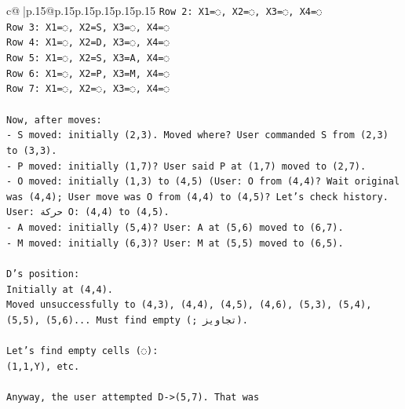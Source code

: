 \documentclass{article}
\begin{document}
{\begin{supertabular}{c@{$\;$}|p{.15\linewidth}@{}p{.15\linewidth}p{.15\linewidth}p{.15\linewidth}p{.15\linewidth}p{.15\linewidth}}
{{{\texttt{Row 2: X1=◌, X2=◌, X3=◌, X4=◌} \\
\texttt{Row 3: X1=◌, X2=S, X3=◌, X4=◌} \\
\texttt{Row 4: X1=◌, X2=D, X3=◌, X4=◌} \\
\texttt{Row 5: X1=◌, X2=S, X3=A, X4=◌} \\
\texttt{Row 6: X1=◌, X2=P, X3=M, X4=◌} \\
\texttt{Row 7: X1=◌, X2=◌, X3=◌, X4=◌} \\
\\ 
\texttt{Now, after moves:} \\
\texttt{{-} S moved: initially (2,3). Moved where? User commanded S from (2,3) to (3,3).} \\
\texttt{{-} P moved: initially (1,7)? User said P at (1,7) moved to (2,7).} \\
\texttt{{-} O moved: initially (1,3) to (4,5) (User: O from (4,4)? Wait original was (4,4); User move was O from (4,4) to (4,5)? Let's check history.} \\
\texttt{User: حركة O: (4,4) to (4,5).} \\
\texttt{{-} A moved: initially (5,4)? User: A at (5,6) moved to (6,7).} \\
\texttt{{-} M moved: initially (6,3)? User: M at (5,5) moved to (6,5).} \\
\\ 
\texttt{D's position:} \\
\texttt{Initially at (4,4).} \\
\texttt{Moved unsuccessfully to (4,3), (4,4), (4,5), (4,6), (5,3), (5,4), (5,5), (5,6)... Must find empty (; تجاويز).} \\
\\ 
\texttt{Let's find empty cells (◌):} \\
\texttt{(1,1,Y), etc.} \\
\\ 
\texttt{Anyway, the user attempted D{-}>(5,7). That was} \\
            }
        }
    }
     \\ \\


\end{supertabular}}
\end{document}
